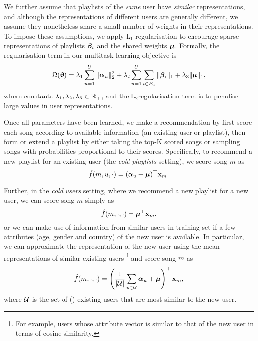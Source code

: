 We further assume that playlists of the \emph{same} user have \emph{similar} representations,
and although the representations of different users are generally different,
we assume they nonetheless share a small number of weights in their representations.
To impose these assumptions, we apply L$_1$ regularisation to encourage sparse representations of playlists ${\bm{\beta}}_i$ %
and the shared weights $\bm{\mu}$.
%
Formally, the regularisation term in our multitask learning objective is
\begin{equation}
\label{eq:reg}
\Omega({\bm{\uptheta}}) = \lambda_1 \sum_{u=1}^U \|{\bm{\alpha}}_u\|_2^2 + \lambda_2 \sum_{u=1}^U \sum_{i \in P_u} \|{\bm{\beta}}_i\|_1 + \lambda_3 \| \bm{\mu} \|_1,
\end{equation}
where constants $\lambda_1, \lambda_2, \lambda_3 \in \mathbb{R}_+$,
and the L$_2$regularisation term is to penalise large values in user representations.


Once all parameters have been learned, 
we make a recommendation by first score each song according to available information (\eg an existing user or playlist),
then form or extend a playlist by either taking the top-K scored songs or sampling songs with probabilities proportional to their scores.
Specifically, to recommend a new playlist for an existing user (\ie the \emph{cold playlists} setting),
we score song $m$ as 
$$
\hat f(m, u, \cdot) = ({\bm{\alpha}}_u + \bm{\mu})^\top \mathbf{x}_m.
$$

Further, in the \emph{cold users} setting, where we recommend a new playlist for a new user,
we can score song $m$ simply as
$$
\hat f(m, \cdot, \cdot) = \bm{\mu}^\top \mathbf{x}_m,
$$
or we can make use of information from similar users in training set if a few attributes 
(\eg age, gender and country) of the new user is available.
In particular, we can approximate the representation of the new user using the mean representations of similar existing users
\footnote{For example, users whose attribute vector is similar to that of the new user in terms of cosine similarity.} 
and score song $m$ as
$$
\hat f(m, \cdot, \cdot) = \left( \frac{1}{|\mathcal{U}|} \sum_{u \in \mathcal{U}} {\bm{\alpha}}_u + \bm{\mu} \right)^\top \mathbf{x}_m,
$$
where $\mathcal{U}$ is the set of () existing users that are most similar to the new user.


